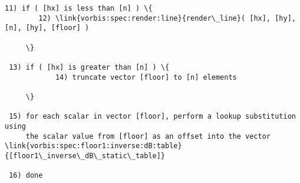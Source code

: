 \begin{description}
\begin{Verbatim}[commandchars=\\\{\}]
 11) if ( [hx] is less than [n] ) \{
        12) \link{vorbis:spec:render:line}{render\_line}( [hx], [hy], [n], [hy], [floor] )

     \}

 13) if ( [hx] is greater than [n] ) \{
            14) truncate vector [floor] to [n] elements

     \}

 15) for each scalar in vector [floor], perform a lookup substitution using
     the scalar value from [floor] as an offset into the vector \link{vorbis:spec:floor1:inverse:dB:table}{[floor1\_inverse\_dB\_static\_table]}

 16) done

\end{Verbatim}

\end{description}
